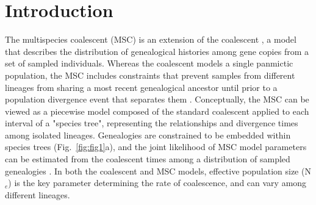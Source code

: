 \documentclass[11pt]{article}
\begin{document}
\section{Introduction}


The multispecies coalescent (MSC) is an extension of the coalescent 
\citep{kingman1982coalescent}, a model that describes the distribution of genealogical 
histories among gene copies from a set of sampled individuals. Whereas the 
coalescent models a single panmictic population, the MSC includes constraints that prevent 
samples from different lineages from sharing a most recent genealogical ancestor until prior
to a population divergence event that separates them \citep{maddison1997gene,maddison2006inferring}. 
Conceptually, the MSC can be viewed as a piecewise model composed of the standard
coalescent applied to each interval of a "species tree", representing the relationships
and divergence times among isolated lineages. Genealogies are constrained to be
embedded within species trees (Fig.~\ref{fig:fig1}a), and the joint likelihood of 
MSC model parameters can be estimated from the coalescent times among a 
distribution of sampled genealogies
\citep{rannala2003bayes,degnan2009gene}. In both the coalescent
and MSC models, effective population size (N$_e$) is the key parameter determining 
the rate of coalescence, and can vary among different lineages. 
\end{document}

